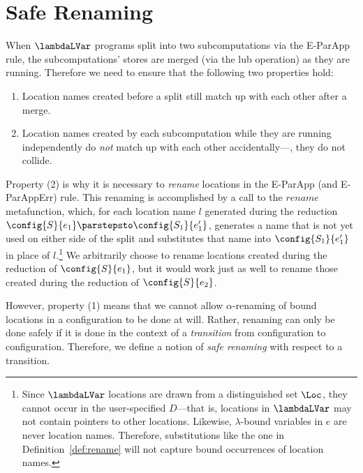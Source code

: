 \section{Safe Renaming}\label{appendix:renaming-lemmas}

When $\lambdaLVar$ programs split into
two subcomputations via the {\sc E-ParApp} rule, 
the subcomputations' stores are merged (via the lub operation)
as they are running.
Therefore we need to ensure that the following two properties hold:
\begin{enumerate}
\item Location names created before a split still match up with each
  other after a merge.
\item Location names created by each subcomputation while they are running
  independently do \emph{not} match up with each other accidentally---\ie, they
  do not collide.
\end{enumerate}
Property (2) is why it is necessary to \emph{rename} locations in the
{\sc E-ParApp} (and {\sc E-ParAppErr}) rule.  
This renaming is accomplished by
a call to the $\mathit{rename}$ metafunction,
which, for each location name $l$ generated during the reduction $\config{S}{e_1} \parstepsto \config{S_1}{e'_1}$,
generates a name that is not yet used on either side of the split
and substitutes that name into $\config{S_1}{e'_1}$ in place of $l$.\footnote{Since
$\lambdaLVar$ locations are drawn from a distinguished set $\Loc$,
they cannot occur in the user-specified $D$---that
is, locations in $\lambdaLVar$ may not contain pointers to other
locations.  Likewise, $\lambda$-bound variables in $e$ are never location names.  Therefore, substitutions
like the one in Definition~\ref{def:rename} will not capture bound occurrences
of location names.} 
We arbitrarily choose to rename locations
  created during the reduction of $\config{S}{e_1}$, but it would work just as well to rename
  those created during the reduction of $\config{S}{e_2}$.

\DefRename

\noindent However, property (1) means that we cannot allow 
$\alpha$-renaming of bound locations in a configuration to be done at will.
Rather, renaming can only be done safely if it is done in the context of a \emph{transition}
from configuration to configuration.
Therefore, we define a notion of \emph{safe renaming} with respect to
a transition.

\DefRenaming

\DefSafeRenaming

\vfill\eject

